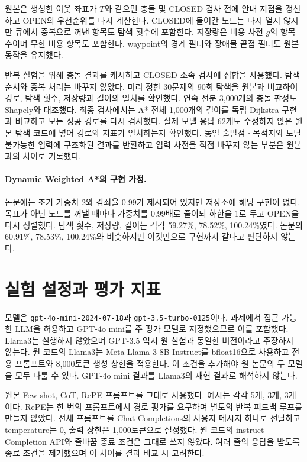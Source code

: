 \documentclass[11pt]{article}
\begin{document}
원본은 생성한 이웃 좌표가 $T$와 같으면 충돌 및 CLOSED 검사 전에 안내 지점을 갱신하고 OPEN의 우선순위를 다시 계산한다. CLOSED에 들어간 노드는 다시 열지 않지만 큐에서 중복으로 꺼낸 항목도 탐색 횟수에 포함한다. 저장량은 비용 사전 $g$의 항목 수이며 무한 비용 항목도 포함한다. waypoint의 경계 필터와 장애물 끝점 필터도 원본 동작을 유지했다.

반복 실험을 위해 충돌 결과를 캐시하고 CLOSED 소속 검사에 집합을 사용했다. 탐색 순서와 중복 처리는 바꾸지 않았다. 미리 정한 30문제의 90회 탐색을 원본과 비교하여 경로, 탐색 횟수, 저장량과 길이의 일치를 확인했다. 연속 선분 3,000개의 충돌 판정도 Shapely와 대조했다. 최종 검사에서는 A* 전체 1,000개의 길이를 독립 Dijkstra 구현과 비교하고 모든 성공 경로를 다시 검사했다. 실제 모델 응답 62개도 수정하지 않은 원본 탐색 코드에 넣어 경로와 지표가 일치하는지 확인했다. 동일 출발점ㆍ목적지와 도달 불가능한 입력에 구조화된 결과를 반환하고 입력 사전을 직접 바꾸지 않는 부분은 원본과의 차이로 기록했다.

\paragraph{Dynamic Weighted A*의 구현 가정.}
논문에는 초기 가중치 2와 감쇠율 0.99가 제시되어 있지만 저장소에 해당 구현이 없다. 목표가 아닌 노드를 꺼낼 때마다 가중치를 0.99배로 줄이되 하한을 1로 두고 OPEN을 다시 정렬했다. 탐색 횟수, 저장량, 길이는 각각 59.27\%, 78.52\%, 100.24\%였다. 논문의 60.91\%, 78.53\%, 100.24\%와 비슷하지만 이것만으로 구현까지 같다고 판단하지 않는다.

\section{실험 설정과 평가 지표}
모델은 \texttt{gpt-4o-mini-2024-07-18}과 \texttt{gpt-3.5-turbo-0125}이다. 과제에서 접근 가능한 LLM을 허용하고 GPT-4o mini를 주 평가 모델로 지정했으므로 이를 포함했다. Llama3는 실행하지 않았으며 GPT-3.5 역시 원 실험과 동일한 버전이라고 주장하지 않는다. 원 코드의 Llama3는 Meta-Llama-3-8B-Instruct를 bfloat16으로 사용하고 전용 프롬프트와 8,000토큰 생성 상한을 적용한다. 이 조건을 추가해야 원 논문의 두 모델을 모두 다룰 수 있다. GPT-4o mini 결과를 Llama3의 재현 결과로 해석하지 않는다.

원본 Few-shot, CoT, RePE 프롬프트를 그대로 사용했다. 예시는 각각 5개, 3개, 3개이다. RePE는 한 번의 프롬프트에서 경로 평가를 요구하며 별도의 반복 피드백 루프를 만들지 않았다. 전체 프롬프트를 Chat Completions의 사용자 메시지 하나로 전달하고 temperature는 0, 출력 상한은 1,000토큰으로 설정했다. 원 코드의 instruct Completion API와 줄바꿈 종료 조건은 그대로 쓰지 않았다. 여러 줄의 응답을 받도록 종료 조건을 제거했으며 이 차이를 결과 비교 시 고려한다.
\end{document}
